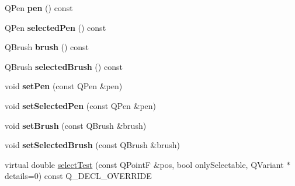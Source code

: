 \begin{DoxyCompactItemize}
\item 
Q\+Pen {\bfseries pen} () const \hypertarget{class_q_c_p_item_ellipse_adb67471eabaf1214c99767f1653ca0ed}{}\label{class_q_c_p_item_ellipse_adb67471eabaf1214c99767f1653ca0ed}

\item 
Q\+Pen {\bfseries selected\+Pen} () const \hypertarget{class_q_c_p_item_ellipse_ac52ab52225d238365ff3264b4b69130f}{}\label{class_q_c_p_item_ellipse_ac52ab52225d238365ff3264b4b69130f}

\item 
Q\+Brush {\bfseries brush} () const \hypertarget{class_q_c_p_item_ellipse_ac012e4fd59fdb1afb6554937bae8f7e1}{}\label{class_q_c_p_item_ellipse_ac012e4fd59fdb1afb6554937bae8f7e1}

\item 
Q\+Brush {\bfseries selected\+Brush} () const \hypertarget{class_q_c_p_item_ellipse_a0043e401a912d54ea3195bab0967b394}{}\label{class_q_c_p_item_ellipse_a0043e401a912d54ea3195bab0967b394}

\item 
void {\bfseries set\+Pen} (const Q\+Pen \&pen)\hypertarget{class_q_c_p_item_ellipse_adb81a663ed2420fcfa011e49f678d1a6}{}\label{class_q_c_p_item_ellipse_adb81a663ed2420fcfa011e49f678d1a6}

\item 
void {\bfseries set\+Selected\+Pen} (const Q\+Pen \&pen)\hypertarget{class_q_c_p_item_ellipse_a6c542fba1dc918041c583f58a50dde99}{}\label{class_q_c_p_item_ellipse_a6c542fba1dc918041c583f58a50dde99}

\item 
void {\bfseries set\+Brush} (const Q\+Brush \&brush)\hypertarget{class_q_c_p_item_ellipse_a49fc74e6965834e873d027d026def798}{}\label{class_q_c_p_item_ellipse_a49fc74e6965834e873d027d026def798}

\item 
void {\bfseries set\+Selected\+Brush} (const Q\+Brush \&brush)\hypertarget{class_q_c_p_item_ellipse_a9693501cfaa43a099655c75bed0dab3f}{}\label{class_q_c_p_item_ellipse_a9693501cfaa43a099655c75bed0dab3f}

\item 
virtual double \hyperlink{class_q_c_p_item_ellipse_adae105786cd2f5dbc557c8846a0ec994}{select\+Test} (const Q\+PointF \&pos, bool only\+Selectable, Q\+Variant $\ast$details=0) const Q\+\_\+\+D\+E\+C\+L\+\_\+\+O\+V\+E\+R\+R\+I\+DE
\end{DoxyCompactItemize}
